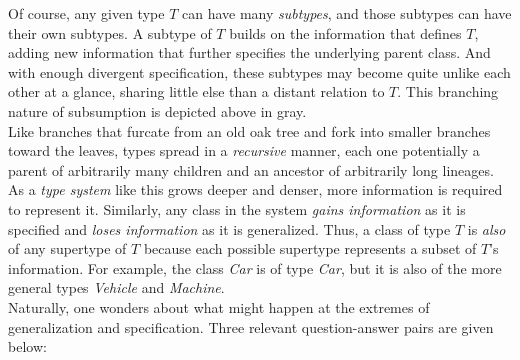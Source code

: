 Of course, any given type $T$ can have many \textit{subtypes}, and those subtypes can have their own subtypes. A subtype of $T$ builds on the information that defines $T$, adding new information that further specifies the underlying parent class. And with enough divergent specification, these subtypes may become quite unlike each other at a glance, sharing little else than a distant relation to $T$. This branching nature of subsumption is depicted above in gray. \\

Like branches that furcate from an old oak tree and fork into smaller branches toward the leaves, types spread in a \textit{recursive} manner, each one potentially a parent of arbitrarily many children and an ancestor of arbitrarily long lineages. As a \textit{type system} like this grows deeper and denser, more information is required to represent it. Similarly, any class in the system \textit{gains information} as it is specified and \textit{loses information} as it is generalized. Thus, a class of type $T$ is \textit{also} of any supertype of $T$ because each possible supertype represents a subset of $T$'s information. For example, the class \textit{Car} is of type \textit{Car}, but it is also of the more general types \textit{Vehicle} and \textit{Machine}. \\

Naturally, one wonders about what might happen at the extremes of generalization and specification. Three relevant question-answer pairs are given below: \\

